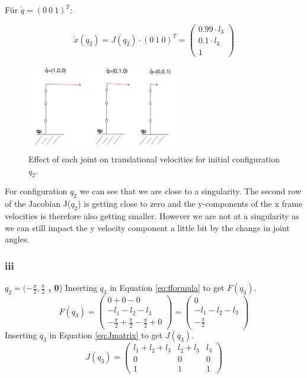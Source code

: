 Für $\dot{q}=(0\ 0\ 1)^T$:

\begin{equation}
    \dot{x}(q_2)=J(q_2)\cdot (0\ 1\ 0)^T = \begin{pmatrix} 
  0.99\cdot l_3\\
  0.1 \cdot l_3\\
  1\end{pmatrix}
\end{equation}

\begin{figure} [H]
   \begin{center}
        \includegraphics[width=0.6\textwidth]{SRC/q_2_joints.JPEG}
   \end{center}
  \caption{Effect of each joint on translational velocities for initial configuration $q_2$.}
  \label{fig:q2}
\end{figure}

For configuration $q_2$ we can see that we are close to a singularity. The second row of the Jacobian J($q_2$) is getting close to zero and the y-components of the x frame velocities is therefore also getting smaller. However we are not at a singularity as we can still impact the y velocity component a little bit by the change in joint angles.


\subsubsection{iii}
\textbf{$q_2=(-\frac{\pi}{2}, \frac{\pi}{2}$ , 0})
\newline 
Inserting $q_3$ in Equation \ref{eq:fformula} to get $F(q_3)$.
\begin{equation}
    F(q_3) = \begin{pmatrix} 
   0 + 0 - 0\\
  -l_1 - l_2 - l_3\\
  -\frac{\pi}{2} + \frac{\pi}{2} - \frac{\pi}{2} +  0\end{pmatrix}= \begin{pmatrix} 
   0\\
   - l_1 - l_2 - l_3\\
  -\frac{\pi}{2}  \end{pmatrix}
\end{equation}
Inserting $q_3$ in Equation \ref{eq:Jmatrix} to get $J(q_3)$.
\begin{equation}
    J(q_3) = \begin{pmatrix} 
   l_1 + l_2 + l_3 & l_2 +l_3& l_3 \\
  0&0&0\\
  1  & 1 & 1\end{pmatrix}
\end{equation}

